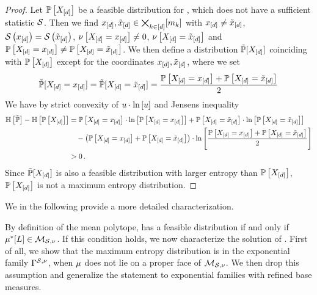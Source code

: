 \begin{proof}
    Let $\mathbb{P}\left[X_{[d]}\right]$ be a feasible distribution for , which does not have a sufficient statistic $\mathcal{S}$.
    Then we find $x_{[d]},\tilde{x}_{[d]}\in\bigtimes_{k\in[d]}[m_{k}]$ with $x_{[d]}\neq\tilde{x}_{[d]}$, $\mathcal{S}\left(x_{[d]}\right)=\mathcal{S}\left(\tilde{x}_{[d]}\right)$, $\nu\left[X_{[d]}=x_{[d]}\right]\neq0$, $\nu\left[X_{[d]}=\tilde{x}_{[d]}\right]$ and $\mathbb{P}\left[X_{[d]}=x_{[d]}\right]\neq\mathbb{P}\left[X_{[d]}=\tilde{x}_{[d]}\right]$.
    We then define a distribution $\tilde{\mathbb{P}}[X_{[d]}]$ coinciding with $\mathbb{P}\left[X_{[d]}\right]$ except for the coordinates $x_{[d]},\tilde{x}_{[d]}$, where we set
    \begin{align*}
        \tilde{\mathbb{P}}[X_{[d]}=x_{[d]}] = \tilde{\mathbb{P}}[X_{[d]}=\tilde{x}_{[d]}] = \frac{\mathbb{P}\left[X_{[d]}=x_{[d]}\right]+\mathbb{P}\left[X_{[d]}=\tilde{x}_{[d]}\right]}{2}
    \end{align*}
    We have by strict convexity of $u\cdot\ln \left[ u \right]$ and Jensens inequality
    \begin{align*}
        \mathbb{H}\left[\tilde{\mathbb{P}}\right] -  \mathbb{H}\left[\mathbb{P}\left[X_{[d]}\right]\right]
        &= \mathbb{P}\left[X_{[d]}=x_{[d]}\right] \cdot \ln \left[ \mathbb{P}\left[X_{[d]}=x_{[d]}\right] \right]
        + \mathbb{P}\left[X_{[d]}=\tilde{x}_{[d]}\right] \cdot \ln \left[ \mathbb{P}\left[X_{[d]}=\tilde{x}_{[d]}\right] \right] \\
        & \quad  - \left(\mathbb{P}\left[X_{[d]}=x_{[d]}\right]+\mathbb{P}\left[X_{[d]}=\tilde{x}_{[d]}\right]\right) \cdot \ln \left[ \frac{\mathbb{P}\left[X_{[d]}=x_{[d]}\right]+\mathbb{P}\left[X_{[d]}=\tilde{x}_{[d]}\right]}{2} \right] \\
        & > 0 \, .
    \end{align*}
    Since $\tilde{\mathbb{P}}[X_{[d]}]$ is also a feasible distribution with larger entropy than $\mathbb{P}\left[X_{[d]}\right]$, $\mathbb{P}\left[X_{[d]}\right]$ is not a maximum entropy distribution.
\end{proof}

We in the following provide a more detailed characterization.


By definition of the mean polytope,  has a feasible distribution if and only if $\mu^*[L]\in\mathcal{M}_{\mathcal{S},\nu}$.
If this condition holds, we now characterize the solution of .
First of all, we show that the maximum entropy distribution is in the exponential family $\Gamma^{\mathcal{S},\nu}$, when $\mu$ does not lie on a proper face of $\mathcal{M}_{\mathcal{S},\nu}$.
We then drop this assumption and generalize the statement to exponential families with refined base measures.

